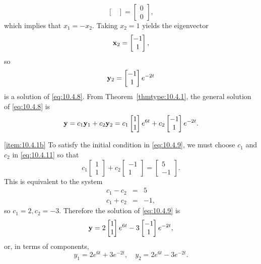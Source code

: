 \documentclass{ximera}
\begin{document}
\begin{example}
\begin{explanation}
$$\begin{bmatrix}
\end{bmatrix}=\begin{bmatrix} 0\\0\end{bmatrix},
$$
which implies that $x_1=-x_2$.  Taking $x_2=1$ yields the eigenvector
$$
{\bf x}_2=\begin{bmatrix}-1\\1\end{bmatrix},
$$
so
$$
{\bf y}_2=\begin{bmatrix}-1\\1\end{bmatrix}e^{-2t}
$$
is a solution of  \eqref{eq:10.4.8}.
From Theorem~\ref{thmtype:10.4.1}, the general solution of
\eqref{eq:10.4.8} is
\begin{equation}\label{eq:10.4.11}
{\bf y}=c_1{\bf y}_1+c_2{\bf y}_2=c_1\begin{bmatrix}1\\1
\end{bmatrix}e^{6t}+c_2\begin{bmatrix}-1\\1
\end{bmatrix}e^{-2t}.
\end{equation}


\ref{item:10.4.1b}
 To satisfy the initial condition in  \eqref{eq:10.4.9}, we must choose
$c_1$ and $c_2$ in  \eqref{eq:10.4.11} so that
$$
c_1\begin{bmatrix}1\\1\end{bmatrix}+c_2\begin{bmatrix}-1\\
1\end{bmatrix}=\begin{bmatrix}5\\-1
\end{bmatrix}.
$$
This is equivalent to the system
\begin{eqnarray*}
c_1-c_2&=&5\\
c_1+c_2&=&-1,
\end{eqnarray*}
so $c_1=2, c_2=-3$.  Therefore the solution of
\eqref{eq:10.4.9} is
$$
{\bf y}=2\begin{bmatrix}1\\1\end{bmatrix}e^{6t}-3
\begin{bmatrix}-1\\1\end{bmatrix}e^{-2t},
$$
or, in terms of components,
$$
y_1=2e^{6t}+3e^{-2t},\quad y_2=2e^{6t}-3e^{-2t}.
$$
\end{explanation}
\end{example}
\end{document}

